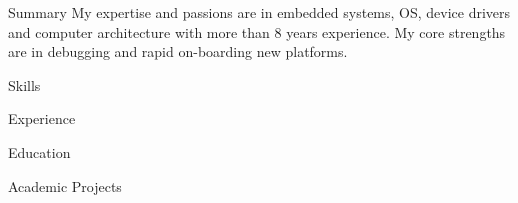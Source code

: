 \documentclass{resume} %
\begin{document}

\begin{rSection}{Summary}
My expertise and passions are in embedded systems, OS, device drivers and computer architecture with more than 8 years experience. My core strengths are in debugging and rapid on-boarding new platforms.
\end{rSection}

\begin{rSection}{Skills}

\end{rSection}


\begin{rSection}{Experience}

\end{rSection}


\begin{rSection}{Education}

\end{rSection}

\pagebreak


\begin{rSection}{Academic Projects}

\end{rSection}

\end{document}
